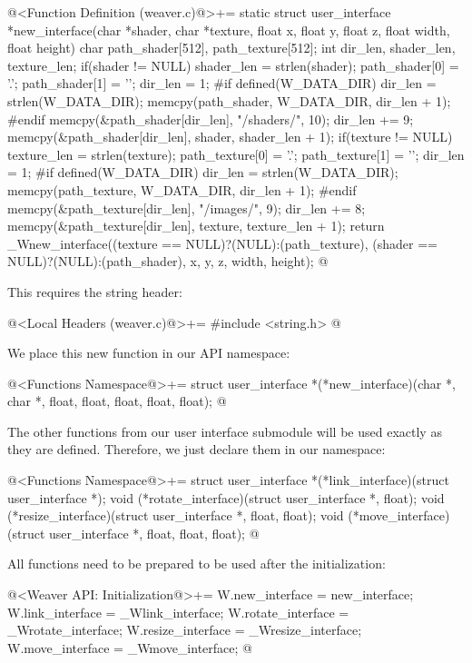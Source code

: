 \iniciocodigo
@<Function Definition (weaver.c)@>+=
static struct user_interface *new_interface(char *shader, char *texture,
                                            float x, float y, float z,
                                            float width, float height){
  char path_shader[512], path_texture[512];
  int dir_len, shader_len, texture_len;
  if(shader != NULL){
    shader_len = strlen(shader);
    path_shader[0] = '.';
    path_shader[1] = '\0';
    dir_len = 1;
#if defined(W_DATA_DIR)
    dir_len = strlen(W_DATA_DIR);
    memcpy(path_shader, W_DATA_DIR, dir_len + 1);
#endif
    memcpy(&path_shader[dir_len], "/shaders/", 10);
    dir_len += 9;
    memcpy(&path_shader[dir_len], shader, shader_len + 1);
  }
  if(texture != NULL){
    texture_len = strlen(texture);
    path_texture[0] = '.';
    path_texture[1] = '\0';
    dir_len = 1;
#if defined(W_DATA_DIR)
    dir_len = strlen(W_DATA_DIR);
    memcpy(path_texture, W_DATA_DIR, dir_len + 1);
#endif
    memcpy(&path_texture[dir_len], "/images/", 9);
    dir_len += 8;
    memcpy(&path_texture[dir_len], texture, texture_len + 1);
  }  
  return _Wnew_interface((texture == NULL)?(NULL):(path_texture),
                         (shader == NULL)?(NULL):(path_shader),
                         x, y, z, width, height);
}
@
\fimcodigo

This requires the string header:

\iniciocodigo
@<Local Headers (weaver.c)@>+=
#include <string.h>
@
\fimcodigo

We place this new function in our API namespace:

\iniciocodigo
@<Functions Namespace@>+=
struct user_interface *(*new_interface)(char *, char *, float, float,
                                        float, float, float);
@
\fimcodigo

The other functions from our user interface submodule will be used
exactly as they are defined. Therefore, we just declare them in our
namespace:

\iniciocodigo
@<Functions Namespace@>+=
struct user_interface *(*link_interface)(struct user_interface *);
void (*rotate_interface)(struct user_interface *, float);
void (*resize_interface)(struct user_interface *, float, float);
void (*move_interface)(struct user_interface *, float, float, float);
@
\fimcodigo

All functions need to be prepared to be used after the initialization:

\iniciocodigo
@<Weaver API: Initialization@>+=
W.new_interface = new_interface;
W.link_interface = _Wlink_interface;
W.rotate_interface = _Wrotate_interface;
W.resize_interface = _Wresize_interface;
W.move_interface = _Wmove_interface;
@
\fimcodigo


